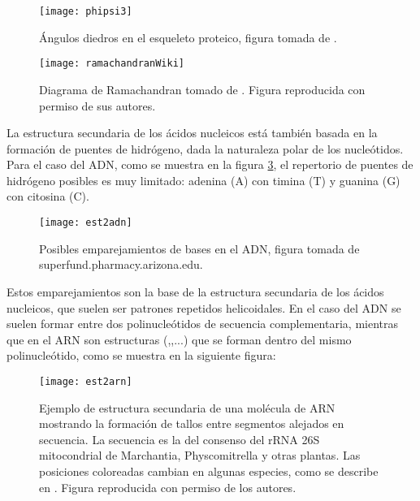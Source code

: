 \begin{figure}
\begin{center} 
\texttt{[image: phipsi3]}
\caption%
{
\'{A}ngulos diedros en el esqueleto proteico, figura tomada de \citep{Balaji2017}.
}
\label{fig:psiphi}
\end{center}
\end{figure}

\begin{figure}
\begin{center} 
\texttt{[image: ramachandranWiki]}
\caption
{
Diagrama de Ramachandran tomado de .
Figura reproducida con permiso de sus autores.
}
\label{fig:ramachandran}
\end{center}
\end{figure}


La estructura secundaria de los \'{a}cidos nucleicos est\'{a} tambi\'{e}n basada en la formaci\'{o}n de puentes de 
hidr\'{o}geno, dada la naturaleza polar de los nucle\'{o}tidos. Para el caso del ADN, como se muestra 
en la figura \ref{fig:est2adn}, el repertorio de puentes de hidr\'{o}geno posibles es muy limitado: 
adenina (A) con timina (T) y guanina (G) con citosina (C).

\begin{figure}
\begin{center} 
\texttt{[image: est2adn]}
\caption%
{
Posibles emparejamientos de bases en el ADN, 
figura tomada de superfund.pharmacy.arizona.edu.
}
\label{fig:est2adn}
\end{center}
\end{figure}

Estos emparejamientos son la base de la estructura secundaria de los \'{a}cidos nucleicos, que suelen ser 
patrones repetidos helicoidales. En el caso del ADN se suelen formar entre dos polinucle\'{o}tidos de secuencia 
complementaria, mientras que en el ARN son estructuras (,,...) 
que se forman dentro del mismo polinucle\'{o}tido, como se muestra en la siguiente figura:

\begin{figure}
\begin{center} 
\texttt{[image: est2arn]}
\caption%
{
Ejemplo de estructura secundaria de una mol\'{e}cula de ARN mostrando la formaci\'{o}n de tallos entre segmentos alejados en secuencia.
La secuencia es la del consenso del rRNA 26S mitocondrial de Marchantia, Physcomitrella y otras plantas. 
Las posiciones coloreadas cambian en algunas especies, como se describe en \cite{Mower2009}.
Figura reproducida con permiso de los autores.
}
\label{fig:est2arn}
\end{center}
\end{figure}

